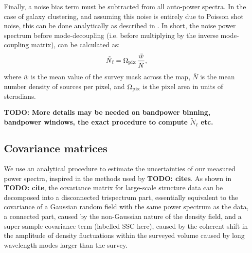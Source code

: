 \documentclass[a4paper,11pt]{article}
\newcommand{\todo}[1]{{\bf TODO: #1}}
\begin{document}
    Finally, a noise bias term must be subtracted from all auto-power spectra. In the case of galaxy clustering, and assuming this noise is entirely due to Poisson shot noise, this can be done analytically as described in \cite{2019MNRAS.484.4127A}. In short, the noise power spectrum before mode-decoupling (i.e. before multiplying by the inverse mode-coupling matrix), can be calculated as:
    \begin{equation}
      \tilde{N}_\ell = \Omega_{\rm pix}\,\frac{\bar{w}}{\bar{N}},
    \end{equation}
    where $\bar{w}$ is the mean value of the survey mask across the map, $\bar{N}$ is the mean number density of sources per pixel, and $\Omega_{\rm pix}$ is the pixel area in units of steradians.
    
    \todo{More details may be needed on bandpower binning, bandpower windows, the exact procedure to compute $\tilde{N}_\ell$ etc.}

  \subsection{Covariance matrices}\label{ssec:methods.covar}
  
We use an analytical procedure to estimate the uncertainties of our measured power spectra, inspired in the methods used by \todo{cites}. As shown in \todo{cite}, the covariance matrix for large-scale structure data can be decomposed into a disconnected trispectrum part, essentially equivalent to the covariance of a Gaussian random field with the same power spectrum as the data, a connected part, caused by the non-Gaussian nature of the density field, and a super-sample covariance term (labelled SSC here), caused by the coherent shift in the amplitude of density fluctuations within the surveyed volume caused by long wavelength modes larger than the survey. 
    
\end{document}
